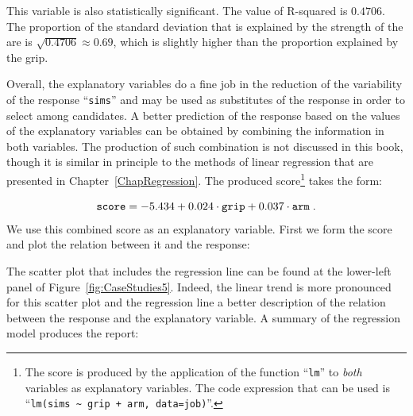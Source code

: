 \documentclass[]{krantz}
\makeatletter
\newenvironment{Shaded}{\begin{snugshade}}{\end{snugshade}}
\newcommand{\DataTypeTok}[1]{\textcolor[rgb]{0.13,0.29,0.53}{#1}}
\newcommand{\FloatTok}[1]{\textcolor[rgb]{0.00,0.00,0.81}{#1}}
\newcommand{\KeywordTok}[1]{\textcolor[rgb]{0.13,0.29,0.53}{\textbf{#1}}}
\newcommand{\NormalTok}[1]{#1}
\newcommand{\OperatorTok}[1]{\textcolor[rgb]{0.81,0.36,0.00}{\textbf{#1}}}
\newcommand{\StringTok}[1]{\textcolor[rgb]{0.31,0.60,0.02}{#1}}
\newenvironment{kframe}{%
\medskip{}
\setlength{\fboxsep}{.8em}
 \def\at@end@of@kframe{}%
 \ifinner\ifhmode%
  \def\at@end@of@kframe{\end{minipage}}%
  \begin{minipage}{\columnwidth}%
 \fi\fi%
 \def\FrameCommand##1{\hskip\@totalleftmargin \hskip-\fboxsep
 \colorbox{shadecolor}{##1}\hskip-\fboxsep
     \hskip-\linewidth \hskip-\@totalleftmargin \hskip\columnwidth}%
 \MakeFramed {\advance\hsize-\width
   \@totalleftmargin\z@ \linewidth\hsize
   \@setminipage}}%
 {\par\unskip\endMakeFramed%
 \at@end@of@kframe}
\renewenvironment{Shaded}{\begin{kframe}}{\end{kframe}}
\theoremstyle{definition}
\theoremstyle{definition}
\theoremstyle{definition}
\theoremstyle{remark}
\makeatother
\begin{document}
This variable is also statistically significant. The value of R-squared
is \(0.4706\). The proportion of the standard deviation that is explained
by the strength of the are is \(\sqrt{0.4706} \approx 0.69\), which is
slightly higher than the proportion explained by the grip.

Overall, the explanatory variables do a fine job in the reduction of the
variability of the response ``\texttt{sims}'' and may be used as substitutes of
the response in order to select among candidates. A better prediction of
the response based on the values of the explanatory variables can be
obtained by combining the information in both variables. The production
of such combination is not discussed in this book, though it is similar
in principle to the methods of linear regression that are presented in
Chapter~\ref{ChapRegression}. The produced score\footnote{The score is produced by the application of the function ``\texttt{lm}'' to
  \emph{both} variables as explanatory variables. The code expression that
  can be used is ``\texttt{lm(sims\ \textasciitilde{}\ grip\ +\ arm,\ data=job)}''.} takes the form:

\[\mbox{\texttt{score}} = -5.434 + 0.024\cdot \mbox{\texttt{grip}}+ 0.037\cdot \mbox{\texttt{arm}}\;.\]
We use this combined score as an explanatory variable. First we form the
score and plot the relation between it and the response:

\begin{Shaded}
\end{Shaded}

The scatter plot that includes the regression line can be found at the
lower-left panel of Figure~\ref{fig:CaseStudies5}. Indeed, the linear
trend is more pronounced for this scatter plot and the regression line a
better description of the relation between the response and the
explanatory variable. A summary of the regression model produces the
report:
\end{document}

